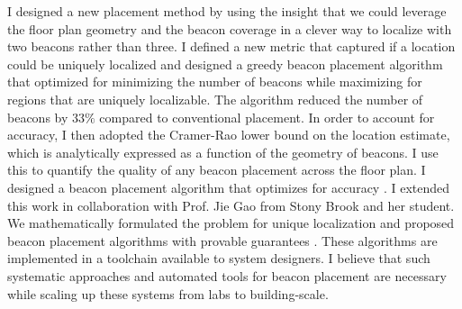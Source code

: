 \documentclass[10pt]{article}
\begin{document}
I designed a new placement method by using the insight that we could leverage the floor plan geometry and the beacon coverage in a clever way to localize with two beacons rather than three. 
I defined a new metric that captured if a location could be uniquely localized  
and designed a greedy beacon placement algorithm that optimized for minimizing the number of beacons while maximizing for regions that are uniquely localizable. The algorithm reduced the number of beacons by $33\%$ compared to conventional placement. In order to account for accuracy, I then adopted the Cramer-Rao lower bound on the location estimate, which is analytically expressed as a function of the geometry of beacons. I use this to quantify the quality of any beacon placement across the floor plan. I designed a beacon placement algorithm that optimizes for accuracy \cite{rajagopal2016beacon}. I extended this work in collaboration with
Prof. Jie Gao from Stony Brook and her student. We mathematically
formulated the problem for unique localization and proposed beacon placement
algorithms with provable guarantees \cite{beaconplacementtheory}.  %
These algorithms are implemented in a toolchain available to system designers. %
I believe that such systematic approaches and automated tools for beacon
placement are necessary while scaling up these systems from labs to
building-scale.

\end{document}
